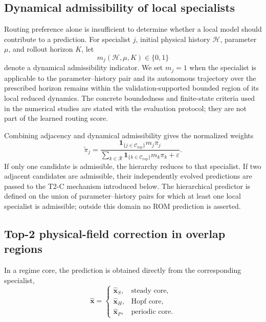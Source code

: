 \subsection{Dynamical admissibility of local specialists}
\label{subsec:admissibility_certification}

Routing preference alone is insufficient to determine whether a local model
should contribute to a prediction.  For specialist $j$, initial physical
history $\mathcal{H}$, parameter $\mu$, and rollout horizon $K$, let
\begin{equation}
  m_j(\mathcal{H},\mu,K)\in\{0,1\}
  \label{eq:admissibility_indicator}
\end{equation}
denote a dynamical admissibility indicator.  We set $m_j=1$ when the
specialist is applicable to the parameter--history pair and its autonomous
trajectory over the prescribed horizon remains within the validation-supported
bounded region of its local reduced dynamics.  The concrete boundedness and
finite-state criteria used in the numerical studies are stated with the
evaluation protocol; they are not part of the learned routing score.

Combining adjacency and dynamical admissibility gives the normalized weights
\begin{equation}
  \widetilde{\pi}_j
  =
  \frac{
    \mathbf{1}_{\{j\in\mathcal{C}_{\mathrm{top}}\}}m_j\pi_j
  }{
    \displaystyle
    \sum_{k\in\mathcal{R}}
    \mathbf{1}_{\{k\in\mathcal{C}_{\mathrm{top}}\}}m_k\pi_k
    +\varepsilon
  }.
  \label{eq:masked_router_weights}
\end{equation}
If only one candidate is admissible, the hierarchy reduces to that
specialist.  If two adjacent candidates are admissible, their independently
evolved predictions are passed to the T2-C mechanism introduced below.  The
hierarchical predictor is defined on the union of parameter--history pairs
for which at least one local specialist is admissible; outside this domain no
ROM prediction is asserted.

\subsection{Top-2 physical-field correction in overlap regions}
\label{subsec:boundary_specific_assembly}

In a regime core, the prediction is obtained directly from the corresponding
specialist,
\begin{equation}
  \widehat{\boldsymbol{x}}
  =
  \begin{cases}
    \widehat{\boldsymbol{x}}_{S},&\text{steady core},\\
    \widehat{\boldsymbol{x}}_{H},&\text{Hopf core},\\
    \widehat{\boldsymbol{x}}_{P},&\text{periodic core}.
  \end{cases}
  \label{eq:core_top1_prediction}
\end{equation}

